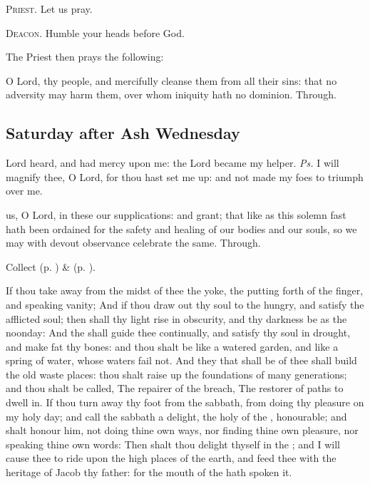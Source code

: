 \textsc{Priest.} Let us pray.\par
\textsc{Deacon.} Humble your heads before God.\par
\begin{rubric}
    The Priest then prays the following:
\end{rubric}
 O Lord, thy people, and mercifully cleanse them from all their sins: that no adversity may harm them, over whom iniquity hath no dominion. Through.


\subsection{Saturday after Ash Wednesday}

\introit
{} Lord heard, and had mercy upon me: the Lord became my helper. \textit{Ps.} I will magnify thee, O Lord, for thou hast set me up: and not made my foes to triumph over me.

\collect
{} us, O Lord, in these our supplications: and grant; that like as this solemn fast hath been ordained for the safety and healing of our bodies and our souls, so we may with devout observance celebrate the same. Through.

\begin{rubric}
     Collect  (p. \pageref{AshWednesdayMassCollect}) \&   (p. \pageref{SPLivingDeparted}).
\end{rubric}

 If thou take away from the midst of thee the yoke, the putting forth of the finger, and speaking vanity; And if thou draw out thy soul to the hungry, and satisfy the afflicted soul; then shall thy light rise in obscurity, and thy darkness be as the noonday: And the  shall guide thee continually, and satisfy thy soul in drought, and make fat thy bones: and thou shalt be like a watered garden, and like a spring of water, whose waters fail not. And they that shall be of thee shall build the old waste places: thou shalt raise up the foundations of many generations; and thou shalt be called, The repairer of the breach, The restorer of paths to dwell in. If thou turn away thy foot from the sabbath, from doing thy pleasure on my holy day; and call the sabbath a delight, the holy of the , honourable; and shalt honour him, not doing thine own ways, nor finding thine own pleasure, nor speaking thine own words: Then shalt thou delight thyself in the ; and I will cause thee to ride upon the high places of the earth, and feed thee with the heritage of Jacob thy father: for the mouth of the  hath spoken it.

